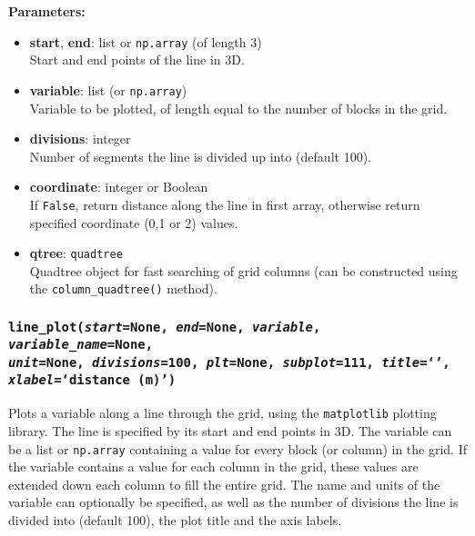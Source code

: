 \textbf{Parameters:}
\begin{itemize}
\item \textbf{start}, \textbf{end}: list or \texttt{np.array} (of length 3)\\
  Start and end points of the line in 3D.
\item \textbf{variable}: list (or \texttt{np.array})\\
  Variable to be plotted, of length equal to the number of blocks in the grid.
\item \textbf{divisions}: integer\\
  Number of segments the line is divided up into (default 100).
\item \textbf{coordinate}: integer or Boolean\\
  If \texttt{False}, return distance along the line in first array, otherwise return specified coordinate (0,1 or 2) values.
\item \textbf{qtree}: \texttt{quadtree}\\
  Quadtree object for fast searching of grid columns (can be constructed using the \texttt{column\_quadtree()} method).
\end{itemize}

\subsubsection{\texttt{line\_plot(\emph{start}=None, \emph{end}=None, \emph{variable}, \emph{variable\_name}=None,\\
\emph{unit}=None, \emph{divisions}=100, \emph{plt}=None, \emph{subplot}=111, \emph{title}=`',\\
\emph{xlabel}=`distance (m)')}}

Plots a variable along a line through the grid, using the \texttt{matplotlib} plotting library. The line is specified by its start and end points in 3D.  The variable can be a list or \texttt{np.array} containing a value for every block (or column) in the grid.  If the variable contains a value for each column in the grid, these values are extended down each column to fill the entire grid.  The name and units of the variable can optionally be specified, as well as the number of divisions the line is divided into (default 100), the plot title and the axis labels.


